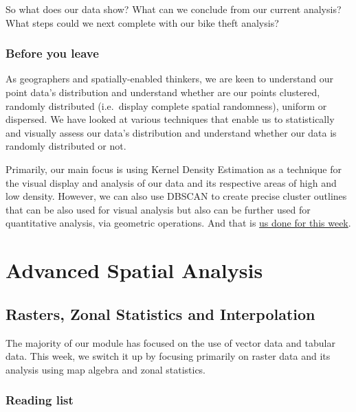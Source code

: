 \documentclass[
]{book}
\begin{document}
So what does our data show? What can we conclude from our current analysis? What steps could we next complete with our bike theft analysis?

\hypertarget{byl-w08}{%
\section{Before you leave}\label{byl-w08}}

As geographers and spatially-enabled thinkers, we are keen to understand our point data's distribution and understand whether are our points clustered, randomly distributed (i.e.~display complete spatial randomness), uniform or dispersed. We have looked at various techniques that enable us to statistically and visually assess our data's distribution and understand whether our data is randomly distributed or not.

Primarily, our main focus is using Kernel Density Estimation as a technique for the visual display and analysis of our data and its respective areas of high and low density. However, we can also use DBSCAN to create precise cluster outlines that can be also used for visual analysis but also can be further used for quantitative analysis, via geometric operations. And that is \href{https://www.youtube.com/watch?v=-zxtbwGogyY}{us done for this week}.

\hypertarget{part-advanced-spatial-analysis}{%
\part*{Advanced Spatial Analysis}\label{part-advanced-spatial-analysis}}

\hypertarget{rasters-zonal-statistics-and-interpolation}{%
\chapter{Rasters, Zonal Statistics and Interpolation}\label{rasters-zonal-statistics-and-interpolation}}

The majority of our module has focused on the use of vector data and tabular data. This week, we switch it up by focusing primarily on raster data and its analysis using map algebra and zonal statistics.

\hypertarget{reading-w09}{%
\section{Reading list}\label{reading-w09}}
\end{document}
